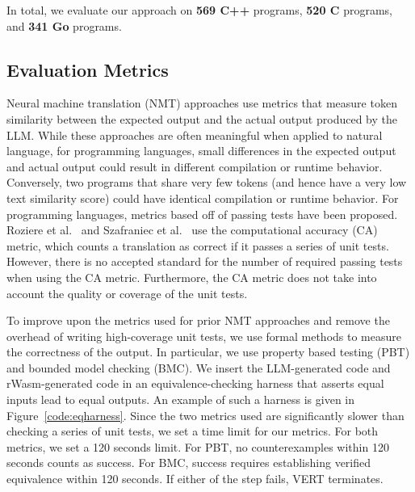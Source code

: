 \documentclass[12pt,openany,oneside,table]{cmuthesis}
\begin{document}
In total, we evaluate our approach on \textbf{569 C++} programs, \textbf{520 C} programs, and \textbf{341 Go} programs.


\subsection{Evaluation Metrics}
Neural machine translation (NMT) approaches use
metrics that measure token similarity between the expected output and the actual output produced by the LLM. While these approaches are often meaningful when applied to natural language, for programming languages, small differences in the expected output and actual output could result in different compilation or runtime behavior.
Conversely, two programs that share very few tokens (and hence have a very low text similarity score) could have identical compilation or runtime behavior.
For programming languages, metrics based off of passing tests have been proposed. Roziere et al.~\cite{roziere2020unsupervised} and Szafraniec
et al.~\cite{szafraniec2022code} use the computational accuracy (CA)
metric, which counts a translation as correct if it passes a series of
unit tests. However, there is no accepted standard for the
number of required passing tests when using the CA metric. Furthermore, the CA metric does not take into
account the quality or coverage of the unit tests.

To improve upon the metrics used for prior NMT approaches and remove the overhead of writing high-coverage unit tests, we use formal methods to measure the correctness of the output. In particular, we use property based testing (PBT) and bounded model checking (BMC). We insert the LLM-generated code and rWasm-generated code in an equivalence-checking harness that asserts equal inputs lead to equal outputs. An example of such a harness is given in Figure~\ref{code:eqharness}. 
Since the two metrics used are significantly
slower than checking a series of unit tests, we set a time limit for
our metrics. For both metrics, we set a 120 seconds limit. For
PBT, no counterexamples within 120 seconds counts as success. For BMC, success requires establishing verified equivalence within 120 seconds. If either of the step fails, VERT terminates.
\end{document}
